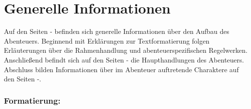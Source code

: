 \thispagestyle{fancy-info}
\section*{Generelle Informationen}

Auf den Seiten \pageref{info-start}-\pageref{info-end} befinden sich generelle Informationen über den Aufbau des Abenteuers. Beginnend mit Erklärungen zur
Textformatierung folgen Erläuterungen über die Rahmenhandlung und abenteuerspezifischen Regelwerken. Anschließend befindt sich auf den Seiten
\pageref{adv-start}-\pageref{adv-end} die Haupthandlungen des Abenteuers. Abschluss bilden Informationen über im Abenteuer auftretende Charaktere auf den
Seiten \pageref{char-start}-\pageref{char-end}.

\subsubsection*{Formatierung:}

